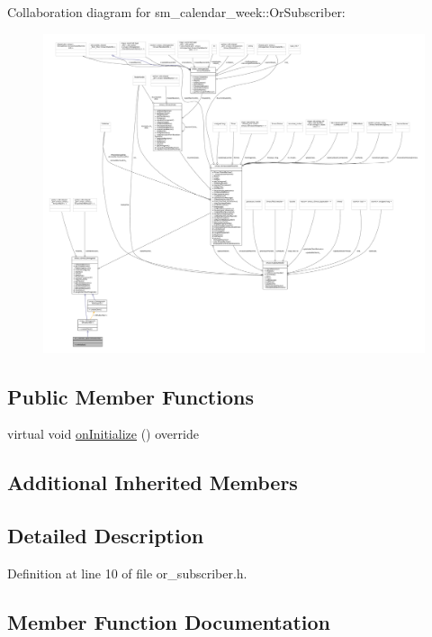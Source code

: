 Collaboration diagram for sm\+\_\+calendar\+\_\+week\+:\+:Or\+Subscriber\+:
\nopagebreak
\begin{figure}[H]
\begin{center}
\leavevmode
\includegraphics[width=350pt]{classsm__calendar__week_1_1OrSubscriber__coll__graph}
\end{center}
\end{figure}
\subsection*{Public Member Functions}
\begin{DoxyCompactItemize}
\item 
virtual void \hyperlink{classsm__calendar__week_1_1OrSubscriber_a2b227a01c29e1d14481ade063907c114}{on\+Initialize} () override
\end{DoxyCompactItemize}
\subsection*{Additional Inherited Members}


\subsection{Detailed Description}


Definition at line 10 of file or\+\_\+subscriber.\+h.



\subsection{Member Function Documentation}
